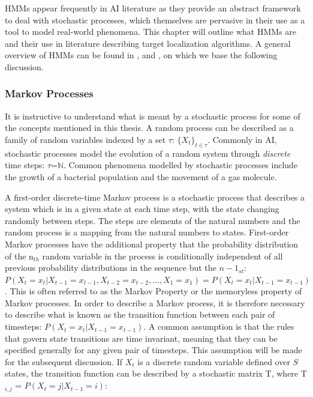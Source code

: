      
HMMs appear frequently in AI literature as they provide an abstract framework to deal with stochastic processes, which themselves are pervasive in their use as a tool to model real-world phenomena. This chapter will outline what HMMs are and their use in literature describing target localization algorithms. A general overview of HMMs can be found in \cite{Murphy1994DynamicLearning}, \cite{Ghahramani2001ANNETWORKS} and \cite{papoulis02}, on which we base the following discussion.

\subsubsection{Markov Processes}\label{subsubsec:MarkovProcesses}
It is instructive to understand what is meant by a stochastic process for some of the concepts mentioned in this thesis. A random process can be described as a family of random variables indexed by a set $\tau$: $\{X_t\}_{t\in\tau}$. Commonly in AI, stochastic processes model the evolution of a random system through \textit{discrete} time steps: $\tau$=$\mathbb N$. Common phenomena modelled by stochastic processes include the growth of a bacterial population and the movement of a gas molecule.\par

A first-order discrete-time Markov process is a stochastic process that describes a system which is in a given state at each time step, with the state changing randomly between steps. The steps are elements of the natural numbers and the random process is a mapping from the natural numbers to states. First-order Markov processes have the additional property that the probability distribution of the n$_{th}$ random variable in the process is conditionally independent of all previous probability distributions in the sequence but the $n-1_{st}$: $P(X_t = x_t | X_{t-1} = x_{t-1}, X_{t-2} = x_{t-2}, ... , X_{1} = x_{1}) = P(X_t = x_t | X_{t-1} = x_{t-1})$. This is often referred to as the Markov Property or the memoryless property of Markov processes. In order to describe a Markov process, it is therefore necessary to describe what is known as the transition function between each pair of timesteps: $P(X_t = x_t | X_{t-1} = x_{t-1})$. A common assumption is that the rules that govern state transitions are time invariant, meaning that they can be specified generally for any given pair of timesteps. This assumption will be made for the subsequent discussion. If $X_t$ is a discrete random variable defined over $S$ states, the transition function can be described by a stochastic matrix T, where T$_{i,j}$ = $P(X_t = j | X_{t-1} = i)$: 

